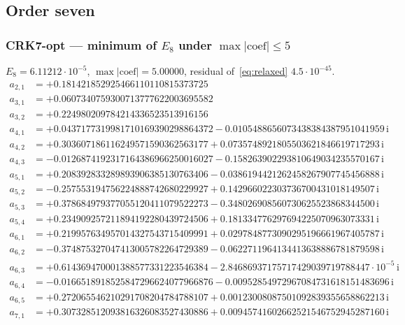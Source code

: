 \subsection*{Order seven}

\subsubsection*{CRK7-opt --- minimum of $E_8$ under $\max|\text{coef}|\le5$}
$E_{8}=6.11212\cdot10^{-5}$, $\max|\text{coef}|=5.00000$, residual of~\eqref{eq:relaxed} $4.5\cdot10^{-45}$.
{\small\allowdisplaybreaks
\begin{align*}
a_{2,1} &= +0.181421852925466110110815373725\\
a_{3,1} &= +0.0607340759300713777622003695582\\
a_{3,2} &= +0.224980209784214336523513916156\\
a_{4,1} &= +0.0437177319981710169390298864372 - 0.0105488656073438384387951041959\,\mathrm{i}\\
a_{4,2} &= +0.303607186116249571590362563177 + 0.0735748921805503621846619717293\,\mathrm{i}\\
a_{4,3} &= -0.0126874192317164386966250016027 - 0.158263902293810649034235570167\,\mathrm{i}\\
a_{5,1} &= +0.208392833289893906385130763406 - 0.0386194421262458267907745456888\,\mathrm{i}\\
a_{5,2} &= -0.257553194756224888742680229927 + 0.142966022303736700431018149507\,\mathrm{i}\\
a_{5,3} &= +0.378684979377055120411079522273 - 0.348026908560730625523868344500\,\mathrm{i}\\
a_{5,4} &= +0.234909257211894192280439724506 + 0.181334776297694225070963073331\,\mathrm{i}\\
a_{6,1} &= +0.219957634957014327543715409991 + 0.0297848773090295196661967405787\,\mathrm{i}\\
a_{6,2} &= -0.374875327047413005782264729389 - 0.0622711964134413638886781879598\,\mathrm{i}\\
a_{6,3} &= +0.614369470001388577331223546384 - 2.84686937175717429039719788447\cdot10^{-5}\,\mathrm{i}\\
a_{6,4} &= -0.0166518918525847296624077966876 - 0.00952854972967084731618151483696\,\mathrm{i}\\
a_{6,5} &= +0.272065546210291708204784788107 + 0.00123008087501092839355658862213\,\mathrm{i}\\
a_{7,1} &= +0.307328512093816326083527430886 + 0.00945741602662521546752945287160\,\mathrm{i}\\

\end{align*}}

